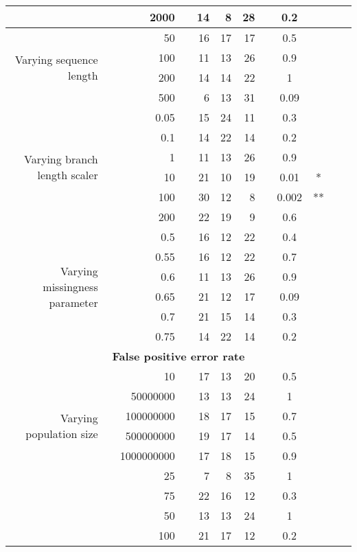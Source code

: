 \begin{table}[!h]
\begin{tabular}{r r r l r r r l c c c l}
   & & 2000 & & 14 & 8 & 28 & & 0.2 &  &  &  \\
\midrule
\multirow{ 4}{2cm}{Varying sequence length}
   & & 50 & & 16 & 17 & 17 & & 0.5 &  &  &  \\
   & & 100 & & 11 & 13 & 26 & & 0.9 &  &  &  \\
   & & 200 & & 14 & 14 & 22 & & 1 &  &  &  \\
   & & 500 & & 6 & 13 & 31 & & 0.09 &  &  &  \\
\midrule
\multirow{ 6}{2cm}{Varying branch length scaler}
   & & 0.05 & & 15 & 24 & 11 & & 0.3 &  &  &  \\
   & & 0.1 & & 14 & 22 & 14 & & 0.2 &  &  &  \\
   & & 1 & & 11 & 13 & 26 & & 0.9 &  &  &  \\
   & & 10 & & 21 & 10 & 19 & & 0.01 & * &  &  \\
   & & 100 & & 30 & 12 & 8 & & 0.002 & ** &  &  \\
   & & 200 & & 22 & 19 & 9 & & 0.6 &  &  &  \\
\midrule
\multirow{ 6}{2cm}{Varying missingness parameter}
   & & 0.5 & & 16 & 12 & 22 & & 0.4 &  &  &  \\
   & & 0.55 & & 16 & 12 & 22 & & 0.7 &  &  &  \\
   & & 0.6 & & 11 & 13 & 26 & & 0.9 &  &  &  \\
   & & 0.65 & & 21 & 12 & 17 & & 0.09 &  &  &  \\
   & & 0.7 & & 21 & 15 & 14 & & 0.3 &  &  &  \\
   & & 0.75 & & 14 & 22 & 14 & & 0.2 &  &  &  \\
\midrule
\multicolumn{12}{c}{\textbf{False positive error rate}} \\
\midrule
\multirow{ 6}{2cm}{Varying population size}
 & & 10 & & 17 & 13 & 20 & & 0.5 &  &  &  \\
   & & 50000000 & & 13 & 13 & 24 & & 1 &  &  &  \\
   & & 100000000 & & 18 & 17 & 15 & & 0.7 &  &  &  \\
   & & 500000000 & & 19 & 17 & 14 & & 0.5 &  &  &  \\
   & & 1000000000 & & 17 & 18 & 15 & & 0.9 &  &  &  \\
\midrule
\multirow{ 6}{2cm}{Varying number of taxa}
   & & 25 & & 7 & 8 & 35 & & 1 &  &  &  \\
   & & 75 & & 22 & 16 & 12 & & 0.3 &  &  &  \\
   & & 50 & & 13 & 13 & 24 & & 1 &  &  &  \\
   & & 100 & & 21 & 17 & 12 & & 0.2 &  &  &  \\

\end{tabular}
\end{table}
